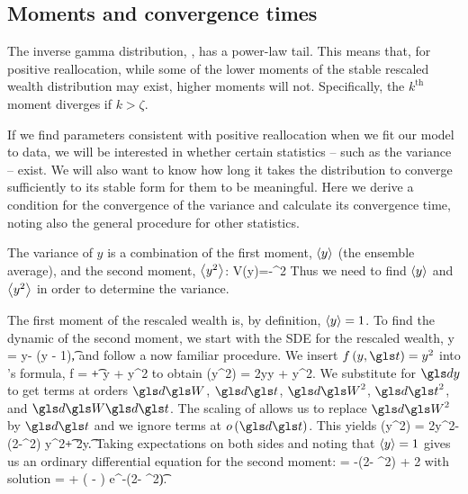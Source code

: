 
\subsection{Moments and convergence times}
The inverse gamma distribution, , has a power-law tail. This means that, for positive reallocation, while some of the lower moments of the stable rescaled wealth distribution may exist, higher moments will not. Specifically, the $k^\text{th}$ moment diverges if $k>\zeta$. 

If we find parameters consistent with positive reallocation when we fit our model to data, we will be interested in whether certain statistics -- such as the variance -- exist. We will also want to know how long it takes the distribution to converge sufficiently to its stable form for them to be meaningful. Here we derive a condition for the convergence of the variance and calculate its convergence time, noting also the general procedure for other statistics.

The variance of $y$ is a combination of the first moment, $\left\langle y\right\rangle$ (the ensemble average), and the second moment, $\left\langle y^2\right\rangle$:
\be
V(y)=-^2
\ee
Thus we need to find $\left\langle y\right\rangle$ and $\left\langle y^2\right\rangle$ in order to determine the variance.

The first moment of the rescaled wealth is, by definition, $\left\langle y\right\rangle=1$. To find the dynamic of the second moment, we start with the SDE for the rescaled wealth,
\be
\gd y = \gsigma y\gd\gW - \gphi\left(y - 1\right)\gd\t,
\ee
and follow a now familiar procedure. We insert $f\left(y,\t\right)=y^2$ into \Ito's formula,
\be
\gd f =  \gd\t +  \gd y +  \gd y^2
\ee
to obtain
\be
\gd \left(y^2\right) = 2y\gd y + \gd y^2.
\ee
We substitute  for $\gd y$ to get terms at orders $\gd\gW$, $\gd\t$, $\gd\gW^2$, $\gd\t^2$, and $\gd\gW\gd\t$. The scaling of \BM allows us to replace $\gd\gW^2$ by $\gd\t$ and we ignore terms at $o\left(\gd\t\right)$. This yields
\bea
\gd \left(y^2\right) = 2\gsigma y^2\gd\gW - \left(2\gphi-\gsigma^2\right) y^2\gd\t + 2\gphi y\gd\t.
\eea
Taking expectations on both sides and noting that $\left\langle y\right\rangle=1$ gives us an ordinary differential equation for the second moment:
\be
{} = -\left(2\gphi - \gsigma^2\right)  + 2\gphi
{}
\ee
with solution
\be
{} =  + \left( - \right) e^{-\left(2\gphi - \gsigma^2\right)\t}.
\ee

